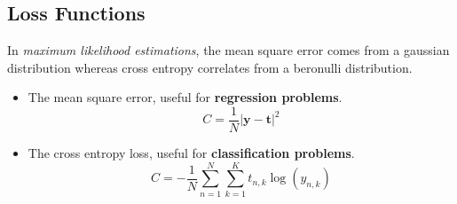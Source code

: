 \documentclass[a4paper]{article}
\numberwithin{equation}{section}
\begin{document}
\subsection{Loss Functions}
In \textit{maximum likelihood estimations}, the mean square error comes from a gaussian distribution whereas cross entropy correlates from a beronulli distribution.
\begin{itemize}
    \item The mean square error, useful for \textbf{regression problems}.
    \begin{equation}
        C = \frac{1}{N}|\mathbf{y-t}|^2
    \end{equation}
    \item The cross entropy loss, useful for \textbf{classification problems}.
    \begin{equation}
        C = -\frac{1}{N}\sum_{n=1}^N\sum_{k=1}^Kt_{n,k}\log(y_{n,k})
    \end{equation}
\end{itemize}
\end{document}
